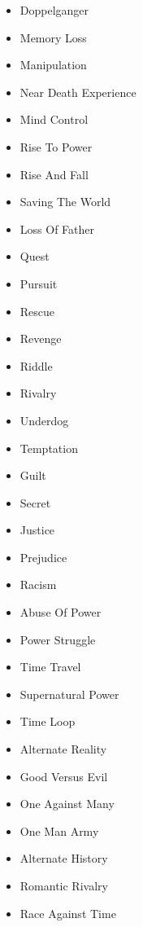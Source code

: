 \begin{minipage}[t]{.5\textwidth}
    \begin{itemize}
        \item Doppelganger 
        \item Memory Loss
        \item Manipulation
        \item Near Death Experience
        \item Mind Control
        \item Rise To Power
        \item Rise And Fall
        \item Saving The World
        \item Loss Of Father
        \item Quest
        \item Pursuit
        \item Rescue
        \item Revenge
        \item Riddle
        \item Rivalry
        \item Underdog
        \item Temptation
        
    \end{itemize}   
\end{minipage}%
\begin{minipage}[t]{.5\textwidth}
        \begin{itemize}
        \item Guilt
        \item Secret
        \item Justice
        \item Prejudice
        \item Racism
        \item Abuse Of Power
        \item Power Struggle
        \item Time Travel
        \item Supernatural Power
        \item Time Loop
        \item Alternate Reality
        \item Good Versus Evil
        \item One Against Many
        \item One Man Army
        \item Alternate History
        \item Romantic Rivalry
        \item Race Against Time
    \end{itemize}
\end{minipage}%
\pagebreak

